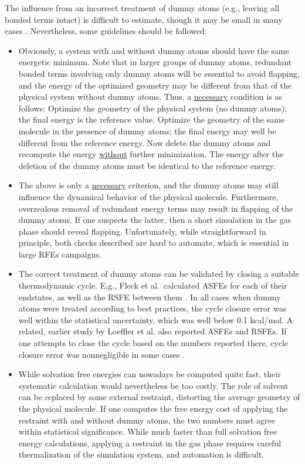 \documentclass[9pt,bestpractices]{livecoms}
\begin{document}
The influence from an incorrect treatment of dummy atoms (e.g., leaving all bonded terms intact) is difficult to estimate, though it may be small in many cases \cite{Fleck_2021}. Nevertheless, some guidelines should be followed:
\begin{itemize}
  \item Obviously, a system with and without dummy atoms should have the same energetic minimum. Note that in larger groups of dummy atoms, redundant bonded terms involving only dummy atoms will be essential to avoid flapping, and the energy of the optimized geometry may be different from that of the physical system without dummy atoms. Thus, a \underline{necessary} condition is as follows: Optimize the geometry of the physical system (no dummy atoms); the final energy is the reference value. Optimize the geometry of the same molecule in the presence of dummy atoms; the final energy may well be different from the reference energy. Now delete the dummy atoms and recompute the energy \underline{without} further minimization. The energy after the deletion of the dummy atoms must be identical to the reference energy. 
\item The above is only a \underline{necessary} criterion, and the dummy atoms may still influence the dynamical behavior of the physical molecule. Furthermore, overzealous removal of redundant energy terms may result in flapping of the dummy atoms. If one suspects the latter, then a short simulation in the gas phase should reveal flapping. Unfortunately, while straightforward in principle, both checks described are hard to automate, which is essential in large RFEs campaigns. 
\item The correct treatment of dummy atoms can be validated by closing a suitable thermodynamic cycle.  E.g., Fleck et al.\ calculated ASFEs for each of their endstates, as well as the RSFE between them \cite{Fleck_2021}. In all cases when dummy atoms were treated according to best practices, the cycle closure error was well within the statistical uncertainty, which was well below 0.1 kcal/mol. A related, earlier study by Loeffler et al. also reported ASFEs and RSFEs. If one attempts to close the cycle based on the numbers reported there, cycle closure error was nonnegligible in some cases \cite{loeffler2018reproducibility}. 
\item While solvation free energies can nowadays be computed quite fast, their systematic calculation would nevertheless be too costly. The role of solvent can be replaced by some external restraint, distorting the average geometry of the physical molecule. If one computes the free energy cost of applying the restraint with and without dummy atoms, the two numbers must agree within statistical significance. While much faster than full solvation free energy calculations, applying a restraint in the gas phase requires careful thermalization of the simulation system, and automation is difficult.
  \end{itemize}
\end{document}
